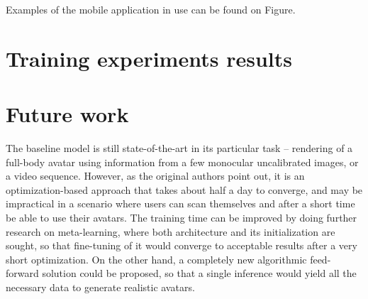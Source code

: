 Examples of the mobile application in use can be found on Figure.
\section{Training experiments results}\label{res:training}



\section{Future work}\label{res:future}

The baseline model \cite{dnn:stylepeople21} is still state-of-the-art in its particular task -- rendering of a full-body avatar using information from a few monocular uncalibrated images, or a video sequence. However, as the original authors point out, it is an optimization-based approach that takes about half a day to converge, and may be impractical in a scenario where users can scan themselves and after a short time be able to use their avatars. The training time can be improved by doing further research on meta-learning, where both architecture and its initialization are sought, so that fine-tuning of it would converge to acceptable results after a very short optimization. On the other hand, a completely new algorithmic feed-forward solution could be proposed, so that a single inference would yield all the necessary data to generate realistic avatars.

